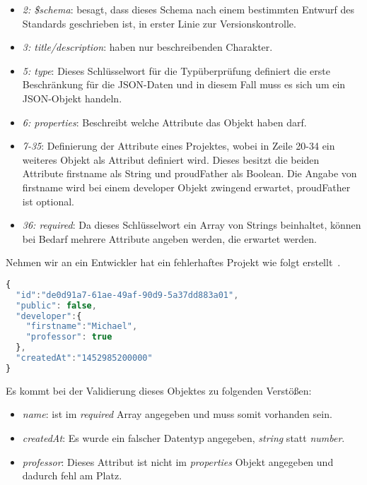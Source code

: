 \begin{itemize}
    \label{basics:jsonschema:items}
    \setlength\itemsep{-1em}
    \item \emph{2: \$schema}: besagt, dass dieses Schema nach einem bestimmten Entwurf des Standards geschrieben ist, in erster Linie zur Versionskontrolle.
    \item \emph{3: title/description}: haben nur beschreibenden Charakter.
    \item \emph{5: type}: Dieses Schlüsselwort für die Typüberprüfung definiert die erste Beschränkung für die JSON-Daten und in diesem Fall muss es sich um ein JSON-Objekt handeln.
    \item \emph{6: properties}: Beschreibt welche Attribute das Objekt haben darf.
    \item \emph{7-35}: Definierung der Attribute eines Projektes, wobei in Zeile 20-34 ein weiteres Objekt als Attribut definiert wird. Dieses besitzt die beiden Attribute firstname als String und proudFather als Boolean. Die Angabe von firstname wird bei einem developer Objekt zwingend erwartet, proudFather ist optional.
    \item \emph{36: required}: Da dieses Schlüsselwort ein Array von Strings beinhaltet, können bei Bedarf mehrere Attribute angeben werden, die erwartet werden.
\end{itemize}

Nehmen wir an ein Entwickler hat ein fehlerhaftes Projekt wie folgt erstellt~.

\begin{lstlisting}[language=Javascript,float=h!,caption={Ein fehlerhaftes Projekt}, label={fig:basics:jsonschema:2}]
{
  "id":"de0d91a7-61ae-49af-90d9-5a37dd883a01",
  "public": false,
  "developer":{
    "firstname":"Michael",
    "professor": true
  },
  "createdAt":"1452985200000"
}
\end{lstlisting}

Es kommt bei der Validierung dieses Objektes zu folgenden Verstößen:

\begin{itemize}
    \setlength\itemsep{-1em}
    \item \emph{name}: ist im \emph{required} Array angegeben und muss somit vorhanden sein.
    \item \emph{createdAt}: Es wurde ein falscher Datentyp angegeben, \emph{string} statt \emph{number}.
    \item \emph{professor}: Dieses Attribut ist nicht im \emph{properties} Objekt angegeben und dadurch fehl am Platz.
\end{itemize}

